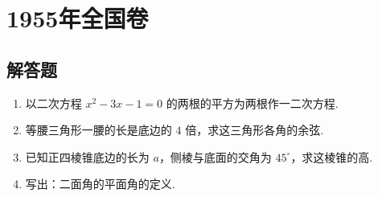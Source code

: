 \chapter{1955年全国卷}

\section{解答题}


\begin{problem}
\begin{enumerate}
\item 以二次方程 \(x^{2}-3x-1=0\) 的两根的平方为两根作一二次方程.
\item 等腰三角形一腰的长是底边的 \(4\) 倍，求这三角形各角的余弦.
\item 已知正四棱锥底边的长为 \(a\)，侧棱与底面的交角为 \(45^{\circ}\)，求这棱锥的高.
\item 写出：二面角的平面角的定义.
\end{enumerate}
\end{problem}

